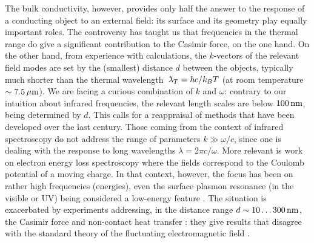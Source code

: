 \documentclass[11pt, oneside]{article}   	%
\newcommand{\lambdabar}{{\mkern+04mu\mathchar'26\mkern-09mu\lambda}}
\begin{document}
The bulk conductivity, however, provides only half
the answer to the response of a conducting object to an external field: its surface 
and its geometry play equally important roles. 
The controversy has taught us that frequencies in the thermal range
do give a significant contribution to the Casimir force, on the one hand. 
On the other hand, from
experience with calculations, the $k$-vectors of the 
relevant field modes are set by the (smallest) distance $d$
between the objects, typically much shorter than the thermal wavelength
$\lambdabar_T = \hbar c / k_B T$ (at room temperature $\sim 7.5\,\mu{\rm m}$).
We are facing a curious combination of $k$ and $\omega$:
contrary to our intuition about infrared frequencies, 
the relevant length scales are below $100\,{\rm nm}$, being determined by $d$.
This calls for a reappraisal of methods
that have been developed over the last century.
Those coming from the context of
infrared spectroscopy do not address the range of parameters $k \gg \omega/c$,
since one is dealing with the response to long wavelengths
$\lambda = 2\pi c / \omega$. More relevant is work on electron energy loss spectroscopy \citep{Verbeeck_2005}
where the fields correspond to the Coulomb potential of a moving charge. 
In that context, however,
the focus has been on rather high frequencies (energies), even the surface plasmon resonance 
(in the visible or UV) being considered a low-energy feature
\citep{Zangwill_1988_chap7}.
The situation is exacerbated by 
experiments addressing,
in the distance range $d \sim 10\ldots 300\,{\rm nm}$,
the Casimir force \citep{Chen_2016b, Bimonte_2016}
and non-contact heat transfer \citep{Kloppstech_2017, Cui_2017a}:
they give results that disagree with the standard theory of 
the fluctuating electromagnetic field \citep{Landau_vol9, Rytov_vol3}. 
\end{document}
